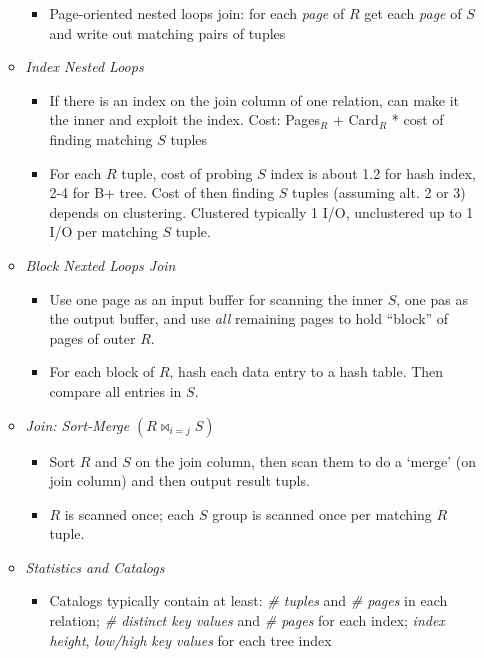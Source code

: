 \documentclass[landscape,8pt]{extarticle}
\begin{document}
\begin{multicols}{5}
\begin{itemize}
\begin{itemize}
\begin{itemize}
                            \item Page-oriented nested loops join: for each \emph{page} of $R$ get each \emph{page} of $S$ and write out matching pairs of tuples
                        \end{itemize}
                  \item \emph{Index Nested Loops}
                        \begin{itemize}
                            \item If there is an index on the join column of one relation, can make it the inner and exploit the index. Cost: Pages$_R$ + Card$_R$ * cost of finding matching $S$ tuples
                            \item For each $R$ tuple, cost of probing $S$ index is about 1.2 for hash index, 2-4 for B+ tree. Cost of then finding $S$ tuples (assuming alt. 2 or 3) depends on clustering. Clustered typically 1 I/O, unclustered up to 1 I/O per matching $S$ tuple.
                        \end{itemize}
                  \item \emph{Block Nexted Loops Join}
                        \begin{itemize}
                            \item Use one page as an input buffer for scanning the inner $S$, one pas as the output buffer, and use \emph{all} remaining pages to hold ``block'' of pages of outer $R$.
                            \item For each block of $R$, hash each data entry to a hash table. Then compare all entries in $S$.
                        \end{itemize}
                  \item \emph{Join: Sort-Merge } $\left (R \bowtie_{i=j} S \right)$
                        \begin{itemize}
                            \item Sort $R$ and $S$ on the join column, then scan them to do a `merge' (on join column) and then output result tupls.
                            \item $R$ is scanned once; each $S$ group is scanned once per matching $R$ tuple.
                        \end{itemize}
                  \item \emph{Statistics and Catalogs}
                        \begin{itemize}
                            \item Catalogs typically contain at least: \emph{\# tuples} and \emph{\# pages} in each relation; \emph{\# distinct key values} and \emph{\# pages} for each index; \emph{index height}, \emph{low/high key values} for each tree index

\end{itemize}
\end{itemize}
\end{itemize}
\end{multicols}
\end{document}

